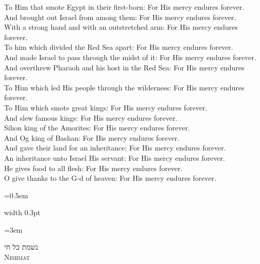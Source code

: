\documentclass[11pt, openany]{book}
\newcommand{\sederdivider}{%
  \par\vspace{6pt}
  \begin{center}
    \textcolor{sedergold}{\pgfornament[width=1.5cm]{11}}
  \end{center}
  \par\vspace{6pt}
}
\newlength{\bidiHebWidth}
\newlength{\bidiEngWidth}
\newenvironment{bilingual}{%
  \par\vspace{4pt}%
}{%
  \noindent
  \begin{minipage}[t]{\bidiEngWidth}
    \setstretch{1.4}\emergencystretch=0.5em\normalsize
    \usebox{\bidiEngBox}
  \end{minipage}%
  \hfill
  {\color{sedergold}\vrule width 0.3pt}%
  \hfill
  \begin{minipage}[t]{\bidiHebWidth}
    \begingroup\hebrewfont\TeXXeTstate=1\beginR
    \large\setstretch{1.4}\emergencystretch=3em\tolerance=9999\parindent=0pt\relax
    \usebox{\bidiHebBox}
    \endR\endgroup
  \end{minipage}%
  \par\vspace{2pt}%
}
\newenvironment{englishcol}{%
  \begin{lrbox}{\bidiEngBox}\begin{minipage}{\bidiEngWidth}%
}{%
  \end{minipage}\end{lrbox}%
}
\newcommand{\subsedertitle}[2]{%
  \par\vspace{8pt}
  \begin{center}
    {\hebrewfontlarge\TeXXeTstate=1\beginR\textcolor{sederblue}{#1}\endR}\\[3pt]
    {\normalsize\scshape\textcolor{sederblue}{#2}}
  \end{center}
  \par\vspace{3pt}
}
\begin{document}
\begin{bilingual}
\begin{englishcol}
To Him that smote Egypt in their first-born: For His mercy endures forever.\\[2pt]
And brought out Israel from among them: For His mercy endures forever.\\[2pt]
With a strong hand and with an outstretched arm: For His mercy endures forever.\\[2pt]
To him which divided the Red Sea apart: For His mercy endures forever.\\[2pt]
And made Israel to pass through the midst of it: For His mercy endures forever.\\[2pt]
And overthrew Pharaoh and his host in the Red Sea: For His mercy endures forever.\\[2pt]
To Him which led His people through the wilderness: For His mercy endures forever.\\[2pt]
To Him which smote great kings: For His mercy endures forever.\\[2pt]
And slew famous kings: For His mercy endures forever.\\[2pt]
Sihon king of the Amorites: For His mercy endures forever.\\[2pt]
And Og king of Bashan: For His mercy endures forever.\\[2pt]
And gave their land for an inheritance: For His mercy endures forever.\\[2pt]
An inheritance unto Israel His servant: For His mercy endures forever.\\[2pt]
He gives food to all flesh: For His mercy endures forever.\\[2pt]
O give thanks to the G-d of heaven: For His mercy endures forever.
\end{englishcol}
\end{bilingual}
\sederdivider

\subsedertitle{נשמת כל חי}{Nishmat}
\end{document}
